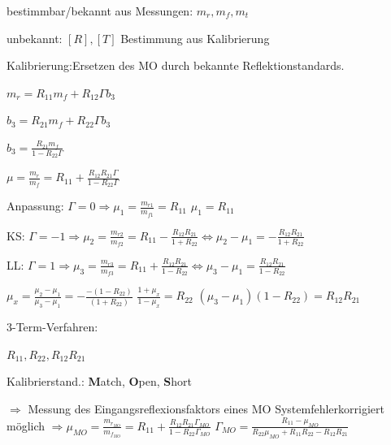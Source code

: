 \begin{pitemize}
    \item bestimmbar/bekannt aus Messungen:
    \subitem $m_r, m_f, m_t$
    \item unbekannt: $[R], [T]$
    \subitem Bestimmung aus Kalibrierung
    \item Kalibrierung:Ersetzen des MO durch bekannte Reflektionstandards.
    \begin{pitemize}
            \item $m_r = R_{11}m_f + R_{12}\Gamma b_3$
            \item $b_3 = R_{21}m_f + R_{22} \Gamma b_3$
            \item $b_3 = \frac{R_{21}m_f}{1 - R_{22}\Gamma}$
            \item $\mu = \frac{m_r}{m_f} = R_{11} + \frac{R_{12}R_{21}\Gamma}{1 - R_{22}\Gamma}$
        \end{pitemize}
    \begin{penumerate}
        \item Anpassung: $\Gamma = 0 \Rightarrow \mu_1 = \frac{m_{r1}}{m_{f1}} = R_{11}$
        \subitem $\mu_1 = R_{11}$
        \item KS: $\Gamma = -1 \Rightarrow \mu_2 = \frac{m_{r2}}{m_{f2}} = R_{11} - \frac{R_{12}R_{21}}{1 + R_{22}} \Leftrightarrow\mu_2 - \mu_1 = -\frac{R_{12}R_{21}}{1 + R_{22}}$
        \item LL: $\Gamma = 1 \Rightarrow \mu_3 = \frac{m_{r3}}{m_{f3}} = R_{11}+ \frac{R_{12}R_{21}}{1 - R_{22}} \Leftrightarrow \mu_3 - \mu_1 = \frac{R_{12}R_{21}}{1 - R_{22}}$
        \item $\mu_x = \frac{\mu_2 - \mu_1}{\mu_3 - \mu_1} = - \frac{-(1-R_{22})}{(1 + R_{22})}$
        \subitem $\frac{1 + \mu_x}{1 - \mu_x} = R_{22}$
        \subitem $(\mu_3 - \mu_1)(1 - R_{22}) = R_{12}R_{21}$
    \end{penumerate} 
\end{pitemize}

3-Term-Verfahren: 
\begin{pitemize}
    \item $R_{11}, R_{22}, R_{12}R_{21}$
    \item Kalibrierstand.: \textbf{M}atch, \textbf{O}pen, \textbf{S}hort
    \item $\Rightarrow$ Messung des Eingangsreflexionsfaktors eines MO Systemfehlerkorrigiert möglich
    \subitem $\Rightarrow \mu_{MO} = \frac{m_{r_{MO}}}{m_{f_{MO}}} = R_{11} + \frac{R_{12}R_{21}\Gamma_{MO}}{1 - R_{22}\Gamma_{MO}}$
    \subitem $\Gamma_{MO} = \frac{R_{11}-\mu_{MO}}{R_{22}\mu_{MO}+ R_{11}R_{22}-R_{12}R_{21}}$ 
\end{pitemize}



